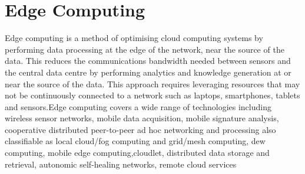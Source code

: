 \section{Edge Computing}

Edge computing is a method of optimising cloud computing systems by 
performing data processing at the edge of the network, near the source of 
the data. This reduces the communications bandwidth needed between sensors 
and the central data centre by performing analytics and knowledge generation 
at or near the source of the data. This approach requires leveraging resources 
that may not be continuously connected to a network such as laptops, 
smartphones, tablets and sensors.Edge computing covers a wide range of 
technologies including wireless sensor networks, mobile data acquisition, 
mobile signature analysis, cooperative distributed peer-to-peer ad hoc 
networking and processing also classifiable as local cloud/fog computing 
and grid/mesh computing, dew computing, mobile edge computing,cloudlet, 
distributed data storage and retrieval, autonomic self-healing networks, 
remote cloud services \cite{edge}

